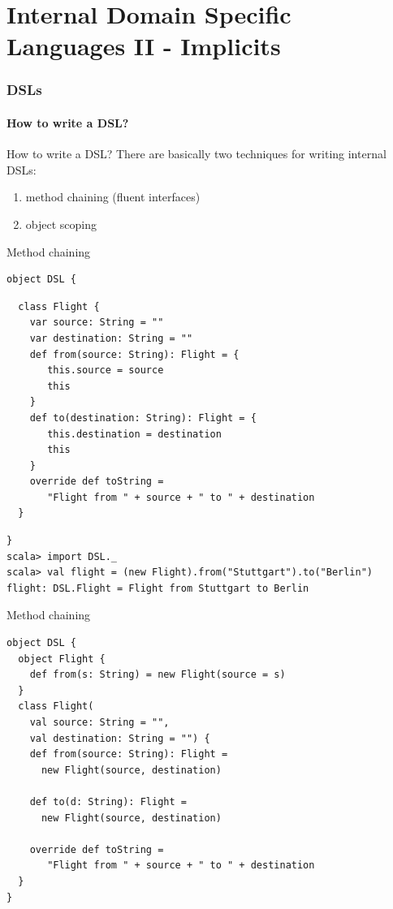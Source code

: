 \part[Implicits]{Internal Domain Specific Languages II - Implicits}

\section{DSLs}
\subsection{How to write a DSL?}
\begin{frame}{How to write a DSL?}
There are basically two techniques for writing internal DSLs:
\begin{enumerate}
  \item method chaining (fluent interfaces)
  \item object scoping
\end{enumerate}
\end{frame}

\begin{frame}[fragile]{Method chaining}
\begin{lstlisting}
object DSL {
\end{lstlisting}
\begin{lstlisting}
  class Flight {
    var source: String = ""
    var destination: String = ""
    def from(source: String): Flight = {
       this.source = source
       this
    }
    def to(destination: String): Flight = {
       this.destination = destination
       this
    }
    override def toString = 
       "Flight from " + source + " to " + destination
  }
\end{lstlisting}
\begin{lstlisting}
}
scala> import DSL._
scala> val flight = (new Flight).from("Stuttgart").to("Berlin")
flight: DSL.Flight = Flight from Stuttgart to Berlin
\end{lstlisting}
\end{frame}

\begin{frame}[fragile]{Method chaining}
\begin{lstlisting}
object DSL {
  object Flight {
    def from(s: String) = new Flight(source = s)
  }
  class Flight(
    val source: String = "",
    val destination: String = "") {
    def from(source: String): Flight = 
      new Flight(source, destination)
      
    def to(d: String): Flight = 
      new Flight(source, destination)
      
    override def toString = 
       "Flight from " + source + " to " + destination
  }
}
\end{lstlisting}
\end{frame}

